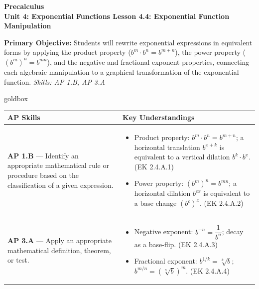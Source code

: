 \documentclass[10pt]{article}
\newcommand{\CourseName}{Precalculus}
\newcommand{\UnitNumberName}{Unit 4: Exponential Functions \quad}
\newcommand{\LessonNumberName}{Lesson 4.4: Exponential Function Manipulation}
\begin{document}
\begin{center}
    {\Large\bfseries \CourseName \\
    {\small\bfseries \UnitNumberName \LessonNumberName}}
\end{center}

\begin{tcolorbox}[colback=sky, colframe=navy, boxrule=0.9pt, arc=2mm,
    left=2mm, right=2mm, top=1.5mm, bottom=1.5mm]
    \textbf{Primary Objective:} Students will rewrite exponential expressions in equivalent
    forms by applying the product property ($b^m \cdot b^n = b^{m+n}$), the power property
    ($(b^m)^n = b^{mn}$), and the negative and fractional exponent properties, connecting each
    algebraic manipulation to a graphical transformation of the exponential function.
    \hfill\textit{\small Skills: AP 1.B, AP 3.A}
\end{tcolorbox}

\renewcommand{\arraystretch}{1.6}
\begin{skillbox}{goldbox}
\begin{tabularx}{\linewidth}{@{}X X@{}}
\textbf{AP Skills} &
\textbf{Key Understandings} \\
\midrule
\textbf{AP 1.B} --- Identify an appropriate mathematical rule or procedure based on the
classification of a given expression. &
\begin{itemize}[leftmargin=1.2em,itemsep=2pt,topsep=0pt]
  \item Product property: $b^m \cdot b^n = b^{m+n}$; a horizontal translation
        $b^{x+k}$ is equivalent to a vertical dilation $b^k \cdot b^x$. (EK 2.4.A.1)
  \item Power property: $(b^m)^n = b^{mn}$; a horizontal dilation $b^{cx}$ is
        equivalent to a base change $(b^c)^x$. (EK 2.4.A.2)
\end{itemize} \\
\textbf{AP 3.A} --- Apply an appropriate mathematical definition, theorem, or test. &
\begin{itemize}[leftmargin=1.2em,itemsep=2pt,topsep=0pt]
  \item Negative exponent: $b^{-n} = \dfrac{1}{b^n}$; decay as a base-flip. (EK 2.4.A.3)
  \item Fractional exponent: $b^{1/k} = \sqrt[k]{b}$; $b^{m/n} = (\sqrt[n]{b})^m$. (EK 2.4.A.4)
\end{itemize} \\
\end{tabularx}
\end{skillbox}
\end{document}

